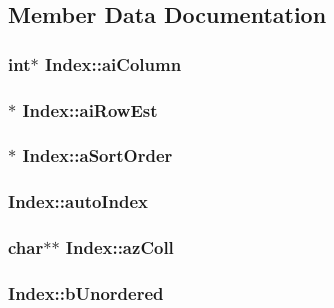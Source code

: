 \subsection{Member Data Documentation}
\hypertarget{struct_index_acbb125339b02ca6819dd2e382de2d639}{
\subsubsection[{ai\-Column}]{\setlength{\rightskip}{0pt plus 5cm}int$\ast$ Index\-::ai\-Column}}\label{struct_index_acbb125339b02ca6819dd2e382de2d639}
\hypertarget{struct_index_aa408555f4da96ca1fae741ff6d33a3bf}{
\subsubsection[{ai\-Row\-Est}]{$\ast$ Index\-::ai\-Row\-Est}}\label{struct_index_aa408555f4da96ca1fae741ff6d33a3bf}
\hypertarget{struct_index_a0a3fc87b53193995f59c9657443e9a99}{
\subsubsection[{a\-Sort\-Order}]{$\ast$ Index\-::a\-Sort\-Order}}\label{struct_index_a0a3fc87b53193995f59c9657443e9a99}
\hypertarget{struct_index_a1fa09182749b6e07b2555d5b3dffb91d}{
\subsubsection[{auto\-Index}]{ Index\-::auto\-Index}}\label{struct_index_a1fa09182749b6e07b2555d5b3dffb91d}
\hypertarget{struct_index_ab690ebb96c0329896b0fe2ab56813b88}{
\subsubsection[{az\-Coll}]{\setlength{\rightskip}{0pt plus 5cm}char$\ast$$\ast$ Index\-::az\-Coll}}\label{struct_index_ab690ebb96c0329896b0fe2ab56813b88}
\hypertarget{struct_index_a1a3114080bcca1d9dd23ce5755d4e4e8}{
\subsubsection[{b\-Unordered}]{ Index\-::b\-Unordered}}\label{struct_index_a1a3114080bcca1d9dd23ce5755d4e4e8}
